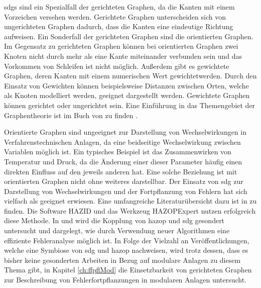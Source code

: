 \acp{sdg} sind ein Spezialfall der gerichteten Graphen, da die Kanten mit einem Vorzeichen versehen werden. Gerichtete Graphen unterscheiden sich von ungerichteten Graphen dadurch, dass die Kanten eine eindeutige Richtung aufweisen. Ein Sonderfall der gerichteten Graphen sind die orientierten Graphen. Im Gegensatz zu gerichteten Graphen k\"onnen bei orientierten Graphen zwei Knoten nicht durch mehr als eine Kante miteinander verbunden sein und das Vorkommen von Schleifen ist nicht m\"oglich. Au\ss{}erdem gibt es gewichtete Graphen, deren Kanten mit einem numerischen Wert \glqq gewichtet\grqq { }werden. Durch den Einsatz von Gewichten k\"onnen beispielsweise Distanzen zwischen Orten, welche als Knoten modelliert werden, geeignet dargestellt werden. Gewichtete Graphen k\"onnen gerichtet oder ungerichtet sein. Eine Einf\"uhrung in das Themengebiet der Graphentheorie ist im Buch  von \citeauthor{Krumke_2012} zu finden \cite{Krumke_2012}.

Orientierte Graphen sind ungeeignet zur Darstellung von Wechselwirkungen in Verfahrenstechnischen Anlagen, da eine beidseitige Wechselwirkung zwischen Variablen m\"oglich ist. Ein typisches Beispiel ist das Zusammenwirken von Temperatur und Druck, da die \"Anderung einer dieser Parameter h\"aufig einen direkten Einfluss auf den jeweils anderen hat. Eine solche Beziehung ist mit orientierten Graphen nicht ohne weiteres darstellbar. \newline
Der Einsatz von \ac{sdg} zur Darstellung von Wechselwirkungen und der Fortpflanzung von Fehlern hat sich vielfach als geeignet erwiesen. Eine umfangreiche Literatur\"ubersicht dazu ist in \cite[S. 3 ff.]{Venkatasubramanian_2003a} zu finden. Die Software HAZID \cite{McCoy_1999,McCoy_1999a, McCoy_1999b,McCoy_2000,McCoy_2000a} und das Werkzeug HAZOPExpert \cite{Vaidhyanathan_1995} nutzen erfolgreich diese Methode. In \cite{Lu_2007} und \cite{Wang_2009} wird die Kopplung von \ac{hazop} und \ac{sdg} gesondert untersucht und dargelegt, wie durch Verwendung neuer Algorithmen eine effiziente Fehleranalyse m\"oglich ist. \newline
In Folge der Vielzahl an Ver\"offentlichungen, welche eine Symbiose von \ac{sdg} und \ac{hazop} nachweisen, wird trotz dessen, dass es bisher keine gesonderten Arbeiten in Bezug auf modulare Anlagen zu diesem Thema gibt, in Kapitel \ref{ch:ffpflMod} die Einsetzbarkeit von gerichteten Graphen zur Beschreibung von Fehlerfortpflanzungen in modularen Anlagen untersucht. 

